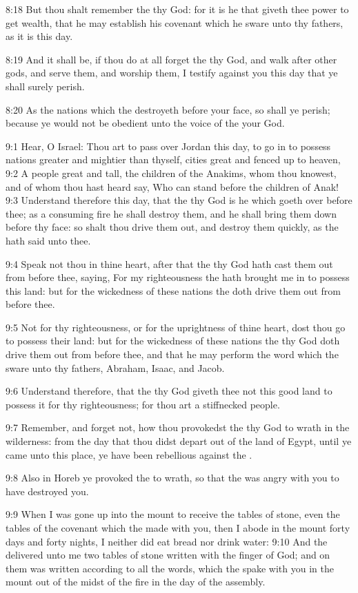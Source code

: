 8:18 But thou shalt remember the \LORD thy God: for it is he that giveth thee power to get wealth, that he may establish his covenant which he sware unto thy fathers, as it is this day.

8:19 And it shall be, if thou do at all forget the \LORD thy God, and walk after other gods, and serve them, and worship them, I testify against you this day that ye shall surely perish.

8:20 As the nations which the \LORD destroyeth before your face, so shall ye perish; because ye would not be obedient unto the voice of the \LORD your God.

9:1 Hear, O Israel: Thou art to pass over Jordan this day, to go in to possess nations greater and mightier than thyself, cities great and fenced up to heaven, 9:2 A people great and tall, the children of the Anakims, whom thou knowest, and of whom thou hast heard say, Who can stand before the children of Anak!  9:3 Understand therefore this day, that the \LORD thy God is he which goeth over before thee; as a consuming fire he shall destroy them, and he shall bring them down before thy face: so shalt thou drive them out, and destroy them quickly, as the \LORD hath said unto thee.

9:4 Speak not thou in thine heart, after that the \LORD thy God hath cast them out from before thee, saying, For my righteousness the \LORD hath brought me in to possess this land: but for the wickedness of these nations the \LORD doth drive them out from before thee.

9:5 Not for thy righteousness, or for the uprightness of thine heart, dost thou go to possess their land: but for the wickedness of these nations the \LORD thy God doth drive them out from before thee, and that he may perform the word which the \LORD sware unto thy fathers, Abraham, Isaac, and Jacob.

9:6 Understand therefore, that the \LORD thy God giveth thee not this good land to possess it for thy righteousness; for thou art a stiffnecked people.

9:7 Remember, and forget not, how thou provokedst the \LORD thy God to wrath in the wilderness: from the day that thou didst depart out of the land of Egypt, until ye came unto this place, ye have been rebellious against the \LORD.

9:8 Also in Horeb ye provoked the \LORD to wrath, so that the \LORD was angry with you to have destroyed you.

9:9 When I was gone up into the mount to receive the tables of stone, even the tables of the covenant which the \LORD made with you, then I abode in the mount forty days and forty nights, I neither did eat bread nor drink water: 9:10 And the \LORD delivered unto me two tables of stone written with the finger of God; and on them was written according to all the words, which the \LORD spake with you in the mount out of the midst of the fire in the day of the assembly.

